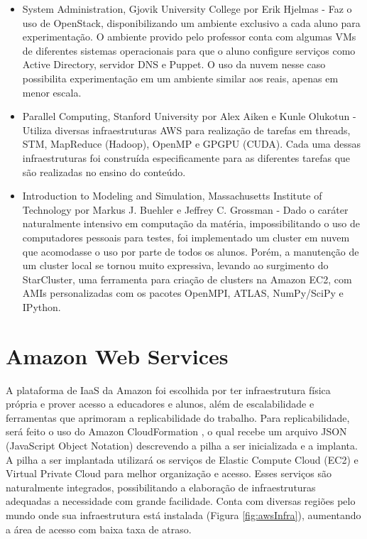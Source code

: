 \documentclass[tg]{mdtufsm}
\begin{document}
\begin{itemize}
\item System Administration, Gjovik University College por Erik Hjelmas \cite{erik} - Faz o uso de OpenStack, disponibilizando um ambiente exclusivo a cada aluno para experimentação. O ambiente provido pelo professor conta com algumas VMs de diferentes sistemas operacionais para que o aluno configure serviços como Active Directory, servidor DNS e Puppet. O uso da nuvem nesse caso possibilita experimentação em um ambiente similar aos reais, apenas em menor escala.

\item Parallel Computing, Stanford University por Alex Aiken e Kunle Olukotun \cite{stanford} - Utiliza diversas infraestruturas AWS para realização de tarefas em threads, STM, MapReduce (Hadoop), OpenMP e GPGPU (CUDA). Cada uma dessas infraestruturas foi construída especificamente para as diferentes tarefas que são realizadas no ensino do conteúdo.

\item Introduction to Modeling and Simulation, Massachusetts Institute of Technology por Markus J. Buehler e Jeffrey C. Grossman  \cite{starclusterMIT} - Dado o caráter naturalmente intensivo em computação da matéria, impossibilitando o uso de computadores pessoais para testes, foi implementado um cluster em nuvem que acomodasse o uso por parte de todos os alunos. Porém, a manutenção de um cluster local se tornou muito expressiva, levando ao surgimento do StarCluster, uma ferramenta para criação de clusters na Amazon EC2, com AMIs personalizadas com os pacotes OpenMPI, ATLAS, NumPy/SciPy e IPython.
\end{itemize}

\section{Amazon Web Services}

A plataforma de IaaS da Amazon foi escolhida por ter infraestrutura física própria e prover acesso a educadores e alunos, além de escalabilidade e ferramentas que aprimoram a replicabilidade do trabalho. Para replicabilidade, será feito o uso do Amazon CloudFormation \cite{awscf}, o qual recebe um arquivo JSON (JavaScript Object Notation) descrevendo a pilha a ser inicializada e a implanta. A pilha a ser implantada utilizará os serviços de Elastic Compute Cloud (EC2)\cite{awsec2} e Virtual Private Cloud\cite{vpc} para melhor organização e acesso. Esses serviços são naturalmente integrados, possibilitando a elaboração de infraestruturas adequadas a necessidade com grande facilidade. Conta com diversas regiões pelo mundo onde sua infraestrutura está instalada (Figura \ref{fig:awsInfra}), aumentando a área de acesso com baixa taxa de atraso.
\end{document}
